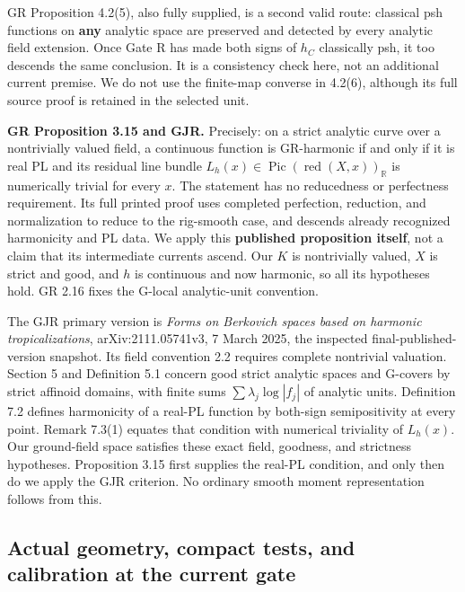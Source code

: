 \documentclass[
  11pt,
]{article}
\begin{document}
GR Proposition 4.2(5), also fully supplied, is a second valid route:
classical psh functions on \textbf{any} analytic space are preserved and
detected by every analytic field extension. Once Gate R has made both
signs of \(h_C\) classically psh, it too descends the same conclusion.
It is a consistency check here, not an additional current premise. We do
not use the finite-map converse in 4.2(6), although its full source
proof is retained in the selected unit.

\textbf{GR Proposition 3.15 and GJR.} Precisely: on a strict analytic
curve over a nontrivially valued field, a continuous function is
GR-harmonic if and only if it is real PL and its residual line bundle
\(L_h(x)\in\operatorname{Pic}(\operatorname{red}(X,x))_{\mathbb R}\) is
numerically trivial for every \(x\). The statement has no reducedness or
perfectness requirement. Its full printed proof uses completed
perfection, reduction, and normalization to reduce to the rig-smooth
case, and descends already recognized harmonicity and PL data. We apply
this \textbf{published proposition itself}, not a claim that its
intermediate currents ascend. Our \(K\) is nontrivially valued, \(X\) is
strict and good, and \(h\) is continuous and now harmonic, so all its
hypotheses hold. GR 2.16 fixes the G-local analytic-unit convention.

The GJR primary version is \emph{Forms on Berkovich spaces based on
harmonic tropicalizations}, arXiv:2111.05741v3, 7 March 2025, the
inspected final-published-version snapshot. Its field convention 2.2
requires complete nontrivial valuation. Section 5 and Definition 5.1
concern good strict analytic spaces and G-covers by strict affinoid
domains, with finite sums \(\sum\lambda_j\log|f_j|\) of analytic units.
Definition 7.2 defines harmonicity of a real-PL function by both-sign
semipositivity at every point. Remark 7.3(1) equates that condition with
numerical triviality of \(L_h(x)\). Our ground-field space satisfies
these exact field, goodness, and strictness hypotheses. Proposition 3.15
first supplies the real-PL condition, and only then do we apply the GJR
criterion. No ordinary smooth moment representation follows from this.

\subsection{Actual geometry, compact tests, and calibration at the
current
gate}\label{actual-geometry-compact-tests-and-calibration-at-the-current-gate}
\end{document}
